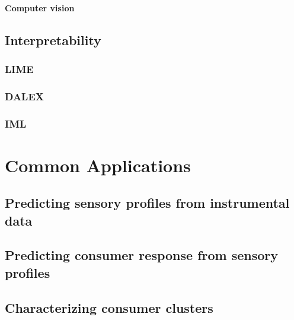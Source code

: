 \documentclass[
]{book}
\begin{document}
\hypertarget{computer-vision}{%
\paragraph{Computer vision}\label{computer-vision}}

\hypertarget{interpretability}{%
\subsection{Interpretability}\label{interpretability}}

\hypertarget{lime}{%
\subsubsection{LIME}\label{lime}}

\hypertarget{dalex}{%
\subsubsection{DALEX}\label{dalex}}

\hypertarget{iml}{%
\subsubsection{IML}\label{iml}}

\hypertarget{common-applications}{%
\section{Common Applications}\label{common-applications}}

\hypertarget{predicting-sensory-profiles-from-instrumental-data}{%
\subsection{Predicting sensory profiles from instrumental data}\label{predicting-sensory-profiles-from-instrumental-data}}

\hypertarget{predicting-consumer-response-from-sensory-profiles}{%
\subsection{Predicting consumer response from sensory profiles}\label{predicting-consumer-response-from-sensory-profiles}}

\hypertarget{characterizing-consumer-clusters}{%
\subsection{Characterizing consumer clusters}\label{characterizing-consumer-clusters}}
\end{document}
